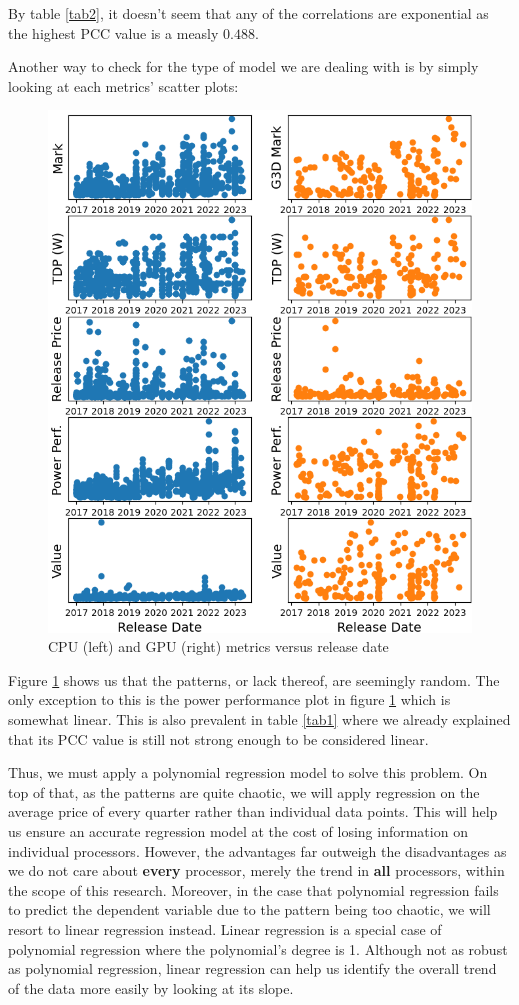 \documentclass[conference]{IEEEtran}
\begin{document}
By table \ref{tab2}, it doesn't seem that any of the correlations are
exponential as the highest PCC value is a measly $0.488$.

Another way to check for the type of model we are dealing with is by simply
looking at each metrics' scatter plots:
\begin{figure}[htbp]
	\centerline{\includegraphics[width=\columnwidth]{scatter.png}}
	\caption{CPU (left) and GPU (right) metrics versus release date}
	\label{fig1}
\end{figure}
Figure \ref{fig1} shows us that the patterns, or lack thereof,
are seemingly random. The only exception to this is the
power performance plot in figure \ref{fig1} which is somewhat linear. This
is also prevalent in table \ref{tab1} where we already explained that its
PCC value is still not strong enough to be considered linear.

Thus, we must apply a polynomial regression model to solve this problem. On
top of that, as the patterns are quite chaotic, we will apply regression on
the average price of every quarter rather than individual data points. This
will help us ensure an accurate regression model at the cost of losing
information on individual processors. However, the advantages far outweigh
the disadvantages as we do not care about \textbf{every} processor, merely the
trend in \textbf{all} processors, within the scope of this research. Moreover,
in the case that polynomial regression fails to predict the dependent variable
due to the pattern being too chaotic, we will resort to linear regression
instead. Linear regression is a special case of polynomial regression where
the polynomial’s degree is 1.  Although not as robust as polynomial regression,
linear regression can help us identify the overall trend of the data more
easily by looking at its slope.
\end{document}
